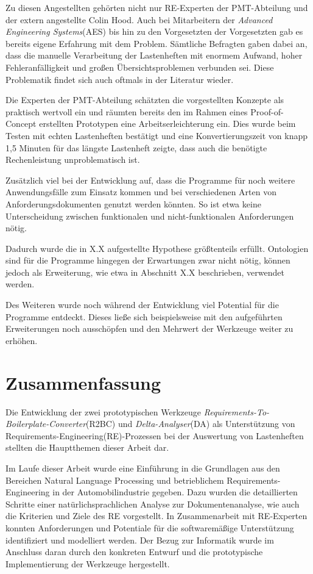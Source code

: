 \documentclass[12pt]{report}
\begin{document}
Zu diesen Angestellten gehörten nicht nur RE-Experten der PMT-Abteilung und der extern angestellte Colin Hood. Auch bei Mitarbeitern der \textit{Advanced Engineering Systems}(AES) bis hin zu den Vorgesetzten der Vorgesetzten gab es bereits eigene Erfahrung mit dem Problem. Sämtliche Befragten gaben dabei an, dass die manuelle Verarbeitung der Lastenheften mit enormem Aufwand, hoher Fehleranfälligkeit und großen Übersichtsproblemen verbunden sei. Diese Problematik findet sich auch oftmals in der Literatur wieder\cite{he13}\cite{mw02}.

Die Experten der PMT-Abteilung schätzten die vorgestellten Konzepte als praktisch wertvoll ein und räumten bereits den im Rahmen eines Proof-of-Concept erstellten Prototypen eine Arbeitserleichterung ein. Dies wurde beim Testen mit echten Lastenheften bestätigt und eine Konvertierungszeit von knapp 1,5 Minuten für das längste Lastenheft zeigte, dass auch die benötigte Rechenleistung unproblematisch ist. 

Zusätzlich viel bei der Entwicklung auf, dass die Programme für noch weitere Anwendungsfälle zum Einsatz kommen und bei verschiedenen Arten von Anforderungsdokumenten genutzt werden könnten. So ist etwa keine Unterscheidung zwischen funktionalen und nicht-funktionalen Anforderungen nötig. 

Dadurch wurde die in X.X aufgestellte Hypothese größtenteils erfüllt. Ontologien sind für die Programme hingegen der Erwartungen zwar nicht nötig, können jedoch als Erweiterung, wie etwa in Abschnitt X.X beschrieben, verwendet werden. 

Des Weiteren wurde noch während der Entwicklung viel Potential für die Programme entdeckt. Dieses ließe sich beispielsweise mit den aufgeführten Erweiterungen noch ausschöpfen und den Mehrwert der Werkzeuge weiter zu erhöhen. 


\section{Zusammenfassung}
Die Entwicklung der zwei prototypischen Werkzeuge \textit{Requirements-To-Boilerplate-Converter}(R2BC) und \textit{Delta-Analyser}(DA) als Unterstützung von Requirements-Engineering(RE)-Prozessen bei der Auswertung von Lastenheften stellten die Hauptthemen dieser Arbeit dar.

Im Laufe dieser Arbeit wurde eine Einführung in die Grundlagen aus den Bereichen Natural Language Processing und betrieblichem Requirements-Engineering in der Automobilindustrie gegeben. Dazu wurden die detaillierten Schritte einer natürlichsprachlichen Analyse zur Dokumentenanalyse, wie auch die Kriterien und Ziele des RE vorgestellt. In Zusammenarbeit mit RE-Experten konnten Anforderungen und Potentiale für die softwaremäßige Unterstützung identifiziert und modelliert werden. Der Bezug zur Informatik wurde im Anschluss daran durch den konkreten Entwurf und die prototypische Implementierung der Werkzeuge hergestellt. 
\end{document}
